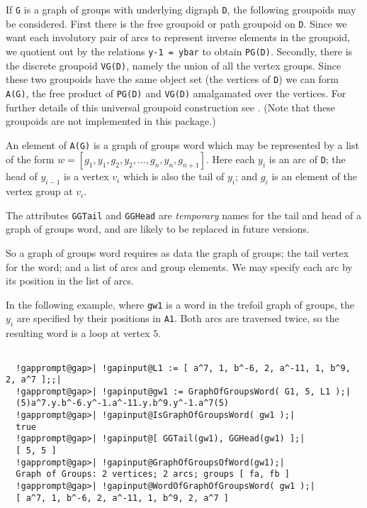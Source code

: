 \documentclass[a4paper,11pt]{report}
\begin{document}
{{{ If \texttt{G} is a graph of groups with underlying digraph \texttt{D}, the following groupoids may be considered. First there is the free groupoid
or path groupoid on \texttt{D}. Since we want each involutory pair of arcs to represent inverse elements in
the groupoid, we quotient out by the relations \texttt{y\texttt{}\texttt{}\texttt{}\texttt{}-1
= ybar} to obtain \texttt{PG(D)}. Secondly, there is the discrete groupoid \texttt{VG(D)}, namely the union of all the vertex groups. Since these two groupoids have
the same object set (the vertices of \texttt{D}) we can form \texttt{A(G)}, the free product of \texttt{PG(D)} and \texttt{VG(D)} amalgamated over the vertices. For further details of this universal groupoid
construction see \cite{emma-thesis}. (Note that these groupoids are not implemented in this package.) 

 An element of \texttt{A(G)} is a graph of groups word which may be represented by a list of the form $w = [g_1,y_1,g_2,y_2,...,g_n,y_n,g_{n+1}]$. Here each $y_i$ is an arc of \texttt{D}; the head of $y_{i-1}$ is a vertex $v_i$ which is also the tail of $y_i$; and $g_i$ is an element of the vertex group at $v_i$. 

 The attributes \texttt{GGTail} and \texttt{GGHead} are \emph{temporary} names for the tail and head of a graph of groups word, and are likely to be
replaced in future versions. 

 So a graph of groups word requires as data the graph of groups; the tail
vertex for the word; and a list of arcs and group elements. We may specify
each arc by its position in the list of arcs. 

 In the following example, where \texttt{gw1} is a word in the trefoil graph of groups, the $y_i$ are specified by their positions in \texttt{A1}. Both arcs are traversed twice, so the resulting word is a loop at vertex $5$. 

 }

 
\begin{Verbatim}[commandchars=!@|,fontsize=\small,frame=single,label=Example]
  
  !gapprompt@gap>| !gapinput@L1 := [ a^7, 1, b^-6, 2, a^-11, 1, b^9, 2, a^7 ];;|
  !gapprompt@gap>| !gapinput@gw1 := GraphOfGroupsWord( G1, 5, L1 );|
  (5)a^7.y.b^-6.y^-1.a^-11.y.b^9.y^-1.a^7(5)
  !gapprompt@gap>| !gapinput@IsGraphOfGroupsWord( gw1 );|
  true
  !gapprompt@gap>| !gapinput@[ GGTail(gw1), GGHead(gw1) ];|
  [ 5, 5 ]
  !gapprompt@gap>| !gapinput@GraphOfGroupsOfWord(gw1);|
  Graph of Groups: 2 vertices; 2 arcs; groups [ fa, fb ]
  !gapprompt@gap>| !gapinput@WordOfGraphOfGroupsWord( gw1 );|
  [ a^7, 1, b^-6, 2, a^-11, 1, b^9, 2, a^7 ]
  

\end{Verbatim}}}
\end{document}
